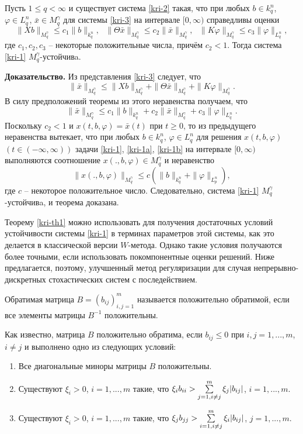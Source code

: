 \begin{theorem}\label{kri-th1}Пусть $1\le q < \infty $ и существует
система \eqref{kri-2} такая, что при любых $b \in k^n_q$, $\varphi \in L^n_q$,
$\bar x \in M_q^\gamma $ для системы \eqref{kri-3} на интервале $[0, \infty)$
справедливы оценки
$$
\| Xb\|_{M_q^\gamma} \le c_1\|b\|_{k_q^n}, \ \ \ \|\Theta \bar
x\|_{M_q^\gamma} \le c_2\|\bar x\|_{M_q^\gamma}, \ \ \  \|K\varphi
\|_{M_q^\gamma} \le c_3  \|\varphi \|_{L^n_q},
$$
где $c_1, c_2, c_3$ -- некоторые положительные числа, причём $c_2 <
1$. Тогда система \eqref{kri-1} $M_q^\gamma$-устойчивa.
\end{theorem}

\textbf{ Доказательство.} Из представления \eqref{kri-3} следует, что
$$
\| \bar x\|_{M_q^\gamma} \le \| Xb\|_{M_q^\gamma} + \|\Theta \bar
x\|_{M_q^\gamma} +  \|K\varphi \|_{M_q^\gamma}.
 $$
В силу предположений теоремы из этого неравенства получаем, что
$$
\|\bar x\|_{M_q^\gamma} \le c_1\|b\|_{k^n_q} + c_2\|\bar
x\|_{M_q^\gamma} + c_3\|\varphi \|_{L^n_q}.
$$
Поскольку $c_2 <1$ и $x(t,b,\varphi) = \bar x(t)$  при $t \geq 0$,
то из предыдущего неравенства вытекает, что при любых $b \in k^n_q$,
$\varphi \in L^n_q$ для решения $x(t, b, \varphi)$ $(t \in (-\infty,
\infty ))$ задачи \eqref{kri-1}, \eqref{kri-1a}, \eqref{kri-1b} на интервале $[0, \infty)$
выполняются соотношение $x(., b, \varphi) \in M_q^\gamma$ и
неравенство
$$
\|x(., b, \varphi)\|_{M_q^\gamma} \le c\left (\|b\|_{k^n_q} +
\|\varphi \|_{L^n_p}\right ),
$$
где $c$ -- некоторое положительное число. Следовательно,  система
\eqref{kri-1} $M_q^\gamma$-устойчивa, и теорема доказана.

Теорему \ref{kri-th1} можно использовать для получения достаточных условий
устойчивости системы \eqref{kri-1} в терминах параметров этой системы, как это
делается в классической версии $W$-метода. Однако такие условия
получаются более точными, если использовать покомпонентные оценки
решений. Ниже предлагается, поэтому, улучшенный метод регуляризации
для случая непрерывно-дискретных стохастических систем с
последействием.

\begin{definition}\label{kri-def4} Обратимая матрица $B = (b_{ij})^m_{i,j=1}$
называется положительно обратимой, если все элементы матрицы
$B^{-1}$ положительны.
\end{definition}

Как известно, матрица $B$ положительно обратима, если $b_{ij} \leq
0$ при $i, j = 1,...,m$, $i\neq j$ и выполнено одно из следующих
условий:
\begin{enumerate}
  \item  Все диагональные миноры матрицы $B$ положительны.
  \item Существуют
$\xi _i>0$, $i = 1,...,m$ такие, что $\xi_i b_{ii} > \sum \limits
_{j=1\\, i \neq j}^m\xi_j |b_{ij}|$, $i = 1,...,m$.
  \item Существуют
$\xi _i>0$, $i = 1,...,m$ такие, что $\xi_j b_{jj} > \sum \limits
_{i=1\\, i \neq j}^m\xi_i |b_{ij}|$, $j = 1,...,m$.
\end{enumerate}

